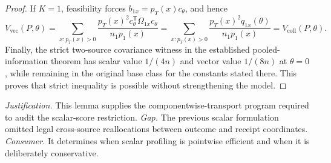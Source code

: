 \documentclass{article}
\begin{document}
\begin{proof}
If \(K=1\), feasibility forces \(b_{1x}=p_T(x)c_\theta\), and hence
\[
V_{\mathrm{vec}}(P,\theta)
=\sum_{x:p_T(x)>0}\frac{p_T(x)^2c_\theta^{\mathsf T}\Omega_{1x}c_\theta}{n_1p_1(x)}
=\sum_{x:p_T(x)>0}\frac{p_T(x)^2q_{1x}(\theta)}{n_1p_1(x)}
=V_{\mathrm{coll}}(P,\theta).
\]
Finally, the strict two-source covariance witness in the established pooled-information theorem has scalar value \(1/(4n)\) and vector value \(1/(8n)\) at \(\theta=0\), while remaining in the original base class for the constants stated there. This proves that strict inequality is possible without strengthening the model.
\end{proof}
\par\smallskip\noindent \textit{Justification.} This lemma supplies the componentwise-transport program required to audit the scalar-score restriction. \textit{Gap.} The previous scalar formulation omitted legal cross-source reallocations between outcome and receipt coordinates. \textit{Consumer.} It determines when scalar profiling is pointwise efficient and when it is deliberately conservative.
\end{document}
